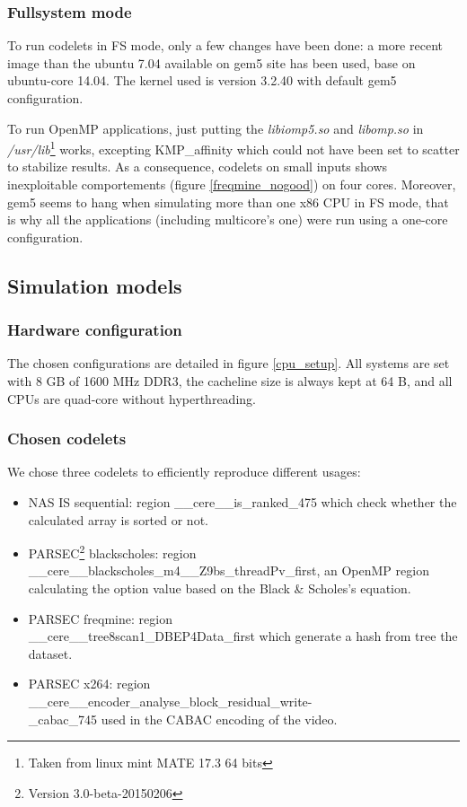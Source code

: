 \documentclass{article}
\begin{document}
\begin{multicols}{2}


\subsubsection{Fullsystem mode}
\label{FS_mode}
To run codelets in FS mode, only a few changes have been done: a more recent image than the ubuntu 7.04 available on gem5 site has been used, base on ubuntu-core 14.04. The kernel used is version 3.2.40 with default gem5 configuration.


To run OpenMP applications, just putting the \textit{libiomp5.so} and \textit{libomp.so} in \textit{/usr/lib}\footnote{Taken from linux mint MATE 17.3 64 bits} works, excepting KMP\_affinity which could not have been set to scatter to stabilize results. As a consequence, codelets on small inputs shows inexploitable comportements (figure \ref{freqmine_nogood}) on four cores. Moreover, gem5 seems to hang when simulating more than one x86 CPU in FS mode, that is why all the applications (including multicore's one) were run using a one-core configuration.

\subsection{Simulation models}
\subsubsection{Hardware configuration}
The chosen configurations are detailed in figure \ref{cpu_setup}. All systems are set with 8 GB of 1600 MHz DDR3, the cacheline size is always kept at 64 B, and all CPUs are quad-core without hyperthreading.

\subsubsection{Chosen codelets}
We chose three codelets to efficiently reproduce different usages:
\begin{itemize}
\item NAS IS sequential: region \_\_cere\_\_is\_ranked\_475 which check whether the calculated array is sorted or not.
\item PARSEC\footnote{Version 3.0-beta-20150206} blackscholes: region \\ \_\_cere\_\_blackscholes\_m4\_\_Z9bs\_threadPv\_first, an OpenMP region calculating the option value based on the Black \& Scholes's equation.
\item PARSEC freqmine: region\\ \_\_cere\_\_tree8scan1\_DBEP4Data\_first which generate a hash from tree the dataset.
\item PARSEC x264: region \\ \_\_cere\_\_encoder\_analyse\_block\_residual\_write-\\ \_cabac\_745 used in the CABAC encoding of the video.
\end{itemize}



\end{multicols}
\end{document}
